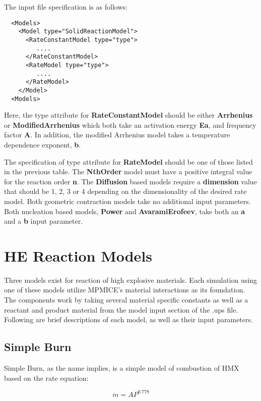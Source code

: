 The input file specification is as follows:

\begin{lstlisting}
  <Models>
    <Model type="SolidReactionModel">
      <RateConstantModel type="type">
         ....
      </RateConstantModel>
      <RateModel type="type">
         ....
      </RateModel>
    </Model>
  <Models>
\end{lstlisting}

\noindent Here, the type attribute for \textbf{RateConstantModel} should be either \textbf{Arrhenius} or \textbf{ModifiedArrhenius}
which both take an activation energy \textbf{Ea}, and frequency factor \textbf{A}.  In addition, the modified Arrhenius
model takes a temperature dependence exponent, \textbf{b}.

The specification of type attribute for \textbf{RateModel} should be one of those listed in the previous table.
The \textbf{NthOrder} model must have a positive integral value for the reaction order \textbf{n}. 
The \textbf{Diffusion} based models require a \textbf{dimension} value that should be 1, 2, 3 or 4 depending
on the dimensionality of the desired rate model.  Both geometric contraction models take no additional
input parameters. Both nucleation based models, \textbf{Power} and \textbf{AvaramiErofeev}, take both 
an \textbf{a} and a \textbf{b} input parameter. 

\section{HE Reaction Models}

Three models exist for reaction of high explosive materials.  Each
simulation using one of these models utilize MPMICE's material
interactions as its foundation.  The components work by taking several
material specific constants as well as a reactant and product material
from the model input section of the .ups file.  Following are brief
descriptions of each model, as well as their input parameters.

\subsection{Simple Burn} \label{Sec:SimpleBurn}

Simple Burn, as the name implies, is a simple model of combustion of HMX based on the rate equation:

\begin{equation}
\dot{m}=A P^{0.778}
\label{simburneqn}
\end{equation}


